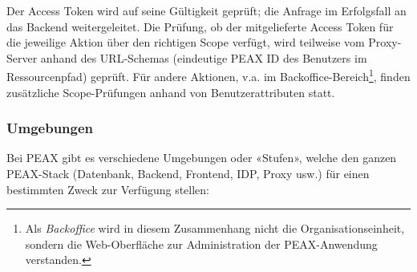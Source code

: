 Der Access Token wird auf seine Gültigkeit geprüft; die Anfrage im Erfolgsfall an das Backend weitergeleitet. Die Prüfung, ob der mitgelieferte Access Token für die jeweilige Aktion über den richtigen Scope verfügt, wird teilweise vom Proxy-Server anhand des URL-Schemas (eindeutige PEAX ID des Benutzers im Ressourcenpfad) geprüft. Für andere Aktionen, v.a. im Backoffice-Bereich\footnote{Als \textit{Backoffice} wird in diesem Zusammenhang nicht die Organisationseinheit, sondern die Web-Oberfläche zur Administration der PEAX-Anwendung verstanden.}, finden zusätzliche Scope-Prüfungen anhand von Benutzerattributen statt.

\subsubsection{Umgebungen}
\label{sec:Umgebungen}

Bei PEAX gibt es verschiedene Umgebungen oder «Stufen», welche den ganzen PEAX-Stack (Datenbank, Backend, Frontend, IDP, Proxy usw.) für einen bestimmten Zweck zur Verfügung stellen:

